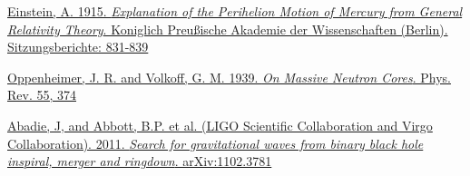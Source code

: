 \documentclass[paper=letterpaper, fontsize=11pt]{scrartcl}
\numberwithin{equation}{section}		%
\numberwithin{figure}{section}			%
\numberwithin{table}{section}			%
\begin{document}
\begin{thebibliography}{99}

 	\href{http://www.gsjournal.net/old/eeuro/vankov.pdf}{Einstein, A. 1915. \emph{Explanation of the
	Perihelion Motion of Mercury from General Relativity Theory}. Koniglich Preußische Akademie der Wissenschaften (Berlin). Sitzungsberichte: 831-839}
	
	\href{http://journals.aps.org/pr/abstract/10.1103/PhysRev.55.374}{Oppenheimer, J. R. and Volkoff, G. M. 1939. \emph{On Massive Neutron Cores}. Phys. Rev. 55, 374}
	
	\href{https://arxiv.org/pdf/1102.3781v1.pdf}{Abadie, J, and Abbott, B.P. et al. (LIGO Scientific Collaboration and Virgo 	Collaboration). 2011. \emph{Search for gravitational waves from binary black hole inspiral, merger and ringdown}.  		arXiv:1102.3781}

\end{thebibliography}

\end{document}
